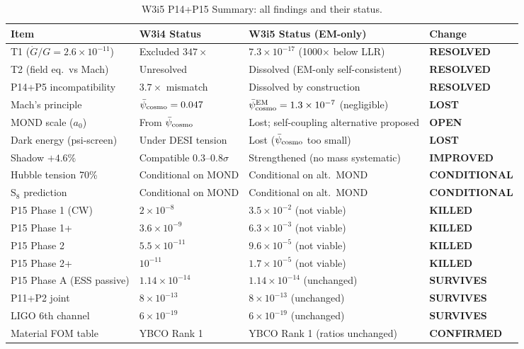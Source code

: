 \documentclass[11pt]{article}
\newcommand{\ee}[1]{\times 10^{#1}}
\newcommand{\Gdot}{\dot{G}/G}
\newcommand{\psicosmo}{\bar{\psi}_{\rm cosmo}}
\begin{document}
\begin{table}[H]
\centering
\caption{W3i5 P14+P15 Summary: all findings and their status.}
\label{tab:summary}
\small
\begin{tabular}{p{4.5cm}p{4cm}p{4cm}p{2cm}}
\toprule
\textbf{Item} & \textbf{W3i4 Status} & \textbf{W3i5 Status (EM-only)} & \textbf{Change} \\
\midrule
T1 ($\Gdot = 2.6\ee{-11}$) & Excluded $347\times$ & $7.3\ee{-17}$ (1000$\times$ below LLR) & \textbf{RESOLVED} \\
T2 (field eq.\ vs Mach) & Unresolved & Dissolved (EM-only self-consistent) & \textbf{RESOLVED} \\
P14+P5 incompatibility & $3.7\times$ mismatch & Dissolved by construction & \textbf{RESOLVED} \\
Mach's principle & $\psicosmo = 0.047$ & $\psicosmo^{\rm EM} = 1.3\ee{-7}$ (negligible) & \textbf{LOST} \\
MOND scale ($a_0$) & From $\psicosmo$ & Lost; self-coupling alternative proposed & \textbf{OPEN} \\
Dark energy (psi-screen) & Under DESI tension & Lost ($\psicosmo$ too small) & \textbf{LOST} \\
Shadow $+4.6\%$ & Compatible $0.3$--$0.8\sigma$ & Strengthened (no mass systematic) & \textbf{IMPROVED} \\
Hubble tension 70\% & Conditional on MOND & Conditional on alt.\ MOND & \textbf{CONDITIONAL} \\
S$_8$ prediction & Conditional on MOND & Conditional on alt.\ MOND & \textbf{CONDITIONAL} \\
\midrule
P15 Phase 1 (CW) & $2\ee{-8}$ & $3.5\ee{-2}$ (not viable) & \textbf{KILLED} \\
P15 Phase 1+ & $3.6\ee{-9}$ & $6.3\ee{-3}$ (not viable) & \textbf{KILLED} \\
P15 Phase 2 & $5.5\ee{-11}$ & $9.6\ee{-5}$ (not viable) & \textbf{KILLED} \\
P15 Phase 2+ & $10^{-11}$ & $1.7\ee{-5}$ (not viable) & \textbf{KILLED} \\
P15 Phase A (ESS passive) & $1.14\ee{-14}$ & $1.14\ee{-14}$ (unchanged) & \textbf{SURVIVES} \\
P11+P2 joint & $8\ee{-13}$ & $8\ee{-13}$ (unchanged) & \textbf{SURVIVES} \\
LIGO 6th channel & $6\ee{-19}$ & $6\ee{-19}$ (unchanged) & \textbf{SURVIVES} \\
Material FOM table & YBCO Rank 1 & YBCO Rank 1 (ratios unchanged) & \textbf{CONFIRMED} \\
\bottomrule
\end{tabular}
\end{table}
\end{document}
